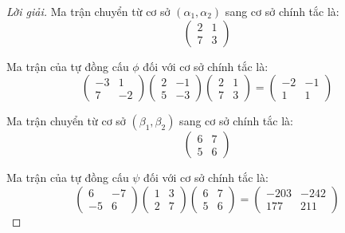 \documentclass[class=nhvh-linear-algebra,crop=false]{standalone}
\begin{document}
\begin{proof}[Lời giải]
    Ma trận chuyển từ cơ sở $(\alpha_{1}, \alpha_{2})$ sang cơ sở chính tắc là:
    \[
        \begin{pmatrix}
            2 & 1 \\
            7 & 3
        \end{pmatrix}
    \]
    \par Ma trận của tự đồng cấu $\phi$ đối với cơ sở chính tắc là:
    \[
        \begin{pmatrix}
            -3 & 1  \\
            7  & -2
        \end{pmatrix}
        \begin{pmatrix}
            2 & -1 \\
            5 & -3
        \end{pmatrix}
        \begin{pmatrix}
            2 & 1 \\
            7 & 3
        \end{pmatrix}=
        \begin{pmatrix}
            -2 & -1 \\
            1  & 1
        \end{pmatrix}
    \]
    \par Ma trận chuyển từ cơ sở $(\beta_{1}, \beta_{2})$ sang cơ sở chính tắc là:
    \[
        \begin{pmatrix}
            6 & 7 \\
            5 & 6
        \end{pmatrix}
    \]
    \par Ma trận của tự đồng cấu $\psi$ đối với cơ sở chính tắc là:
    \[
        \begin{pmatrix}
            6  & -7 \\
            -5 & 6
        \end{pmatrix}
        \begin{pmatrix}
            1 & 3 \\
            2 & 7
        \end{pmatrix}
        \begin{pmatrix}
            6 & 7 \\
            5 & 6
        \end{pmatrix}=
        \begin{pmatrix}
            -203 & -242 \\
            177  & 211
        \end{pmatrix}
\]
\end{proof}
\end{document}
